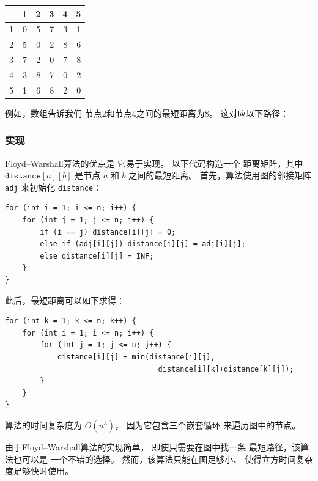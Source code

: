 \begin{center}
\begin{tabular}{r|rrrrr}
 & 1 & 2 & 3 & 4 & 5 \\
\hline
1 & 0 & 5 & 7 & 3 & 1 \\
2 & 5 & 0 & 2 & 8 & 6 \\
3 & 7 & 2 & 0 & 7 & 8 \\
4 & 3 & 8 & 7 & 0 & 2 \\
5 & 1 & 6 & 8 & 2 & 0 \\
\end{tabular}
\end{center}

例如，数组告诉我们
节点2和节点4之间的最短距离为8。
这对应以下路径：

\begin{center}
\end{center}

\subsubsection{实现}

Floyd–Warshall算法的优点是
它易于实现。
以下代码构造一个
距离矩阵，其中 $\texttt{distance}[a][b]$
是节点 $a$ 和 $b$ 之间的最短距离。
首先，算法使用图的邻接矩阵 \texttt{adj}
来初始化 \texttt{distance}：

\begin{lstlisting}
for (int i = 1; i <= n; i++) {
    for (int j = 1; j <= n; j++) {
        if (i == j) distance[i][j] = 0;
        else if (adj[i][j]) distance[i][j] = adj[i][j];
        else distance[i][j] = INF;
    }
}
\end{lstlisting}
此后，最短距离可以如下求得：
\begin{lstlisting}
for (int k = 1; k <= n; k++) {
    for (int i = 1; i <= n; i++) {
        for (int j = 1; j <= n; j++) {
            distance[i][j] = min(distance[i][j],
                                   distance[i][k]+distance[k][j]);
        }
    }
}
\end{lstlisting}

算法的时间复杂度为 $O(n^3)$，
因为它包含三个嵌套循环
来遍历图中的节点。

由于Floyd–Warshall算法的实现简单，
即使只需要在图中找一条
最短路径，该算法也可以是
一个不错的选择。
然而，该算法只能在图足够小、
使得立方时间复杂度足够快时使用。
